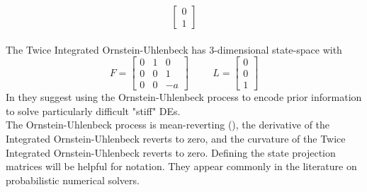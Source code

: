 {$$\begin{bmatrix}
        0 \\ 1
    \end{bmatrix}$$
    \\ The Twice Integrated Ornstein-Uhlenbeck has 3-dimensional state-space with $$F=\begin{bmatrix}
        0 & 1 & 0 \\ 0 & 0 & 1 \\ 0 & 0 & -a
    \end{bmatrix} \hspace{1cm} L=\begin{bmatrix}
         0 \\ 0 \\  1
    \end{bmatrix}$$
    In \cite{exponential_probabilistic} they suggest using the Ornstein-Uhlenbeck process to encode prior information to solve particularly difficult "stiff" DEs.\\
    The Ornstein-Uhlenbeck process is mean-reverting (\cite{probnum}), the derivative of the Integrated Ornstein-Uhlenbeck reverts to zero, and the curvature of the Twice Integrated Ornstein-Uhlenbeck reverts to zero.
}
Defining the state projection matrices will be helpful for notation. They appear commonly in the literature on probabilistic numerical solvers.

